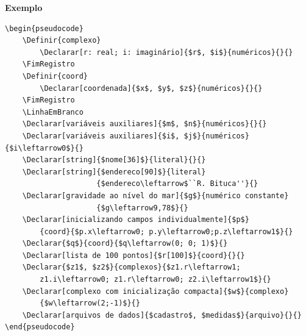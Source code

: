 \documentclass[a4paper,12pt,oneside,onecolumn,final,fleqn]{repUERJ}
\begin{document}
\noindent\textbf{Exemplo}

\begin{verbatim}
\begin{pseudocode}
    \Definir{complexo}
        \Declarar[r: real; i: imaginário]{$r$, $i$}{numéricos}{}{}
    \FimRegistro
    \Definir{coord}
        \Declarar[coordenada]{$x$, $y$, $z$}{numéricos}{}{}
    \FimRegistro
    \LinhaEmBranco
    \Declarar[variáveis auxiliares]{$m$, $n$}{numéricos}{}{}
    \Declarar[variáveis auxiliares]{$i$, $j$}{numéricos}{$i\leftarrow0$}{}
    \Declarar[string]{$nome[36]$}{literal}{}{}
    \Declarar[string]{$endereco[90]$}{literal}
                     {$endereco\leftarrow$``R. Bituca''}{}
    \Declarar[gravidade ao nível do mar]{$g$}{numérico constante}
                     {$g\leftarrow9,78$}{}
    \Declarar[inicializando campos individualmente]{$p$}
        {coord}{$p.x\leftarrow0; p.y\leftarrow0;p.z\leftarrow1$}{}
    \Declarar{$q$}{coord}{$q\leftarrow(0; 0; 1)$}{}
    \Declarar[lista de 100 pontos]{$r[100]$}{coord}{}{}
    \Declarar{$z1$, $z2$}{complexos}{$z1.r\leftarrow1;
        z1.i\leftarrow0; z1.r\leftarrow0; z2.i\leftarrow1$}{}
    \Declarar[complexo com inicialização compacta]{$w$}{complexo}
        {$w\leftarrow(2;-1)$}{}
    \Declarar[arquivos de dados]{$cadastro$, $medidas$}{arquivo}{}{}
\end{pseudocode}
\end{verbatim}

\noindent{}
\end{document}
